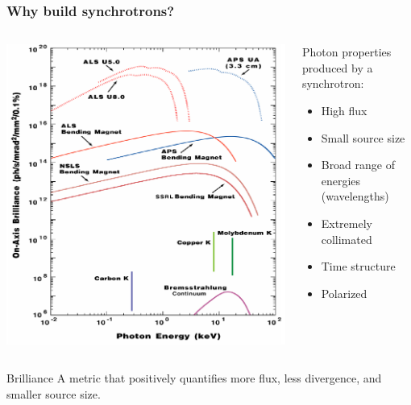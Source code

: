 \documentclass[10pt, xcolor=x11names, compress]{beamer}
\begin{document}
\begin{frame}
  \frametitle{Why build synchrotrons?}
  \begin{columns}
    \begin{column}{0.55\linewidth}
      \begin{center}
        \includegraphics[width=0.9\linewidth]{synch/brilliance.png}
      \end{center}
    \end{column}
    \begin{column}{0.45\linewidth}
      Photon properties produced by a synchrotron:
      \begin{itemize}
      \item High flux
      \item Small source size
      \item Broad range of energies (wavelengths)
      \item Extremely collimated
      \item Time structure
      \item Polarized
      \end{itemize}
    \end{column}
  \end{columns}
  \begin{block}{Brilliance}
    A metric that positively quantifies more flux, less divergence,
    and smaller source size.
  \end{block}
\end{frame}
\end{document}
